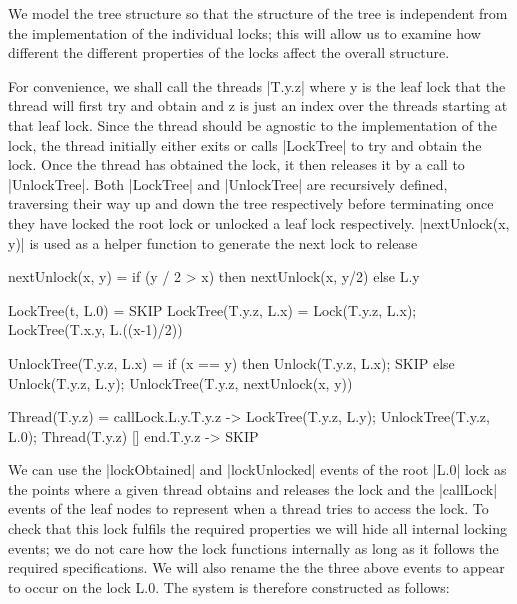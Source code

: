 We model the tree structure so that the structure of the tree is independent from the implementation of the individual locks; this will allow us to examine how different the different properties of the locks affect the overall structure.

For convenience, we shall call the threads |T.{y}.{z}| where y is the leaf lock that the thread will first try and obtain and z is just an index over the threads starting at that leaf lock. Since the thread should be agnostic to the implementation of the lock, the thread initially either exits or calls |LockTree| to try and obtain the lock. Once the thread has obtained the lock, it then releases it by a call to |UnlockTree|. Both |LockTree| and |UnlockTree| are recursively defined, traversing their way up and down the tree respectively before terminating once they have locked the root lock or unlocked a leaf lock respectively. 
|nextUnlock(x, y)| is used as a helper function to generate the next lock to release 

\begin{cspm}
  nextUnlock(x, y) = if (y / 2 > x) then nextUnlock(x, y/2) else L.y 

  LockTree(t, L.0) = SKIP
  LockTree(T.y.z, L.x) = Lock(T.y.z, L.x); LockTree(T.x.y, L.((x-1)/2))

  UnlockTree(T.y.z, L.x) = if (x == y) then Unlock(T.y.z, L.x); SKIP
                           else Unlock(T.y.z, L.y); 
                                UnlockTree(T.y.z, nextUnlock(x, y))

  Thread(T.y.z) = callLock.L.y.T.y.z -> LockTree(T.y.z, L.y); 
                                          UnlockTree(T.y.z, L.0); 
                                          Thread(T.y.z)
                 [] end.T.y.z -> SKIP
\end{cspm}

We can use the |lockObtained| and |lockUnlocked| events of the root |L.0| lock as the points where a given thread obtains and releases the lock and the |callLock| events of the leaf nodes to represent when a thread tries to access the lock. To check that this lock fulfils the required properties we will hide all internal locking events; we do not care how the lock functions internally as long as it follows the required specifications. We will also rename the the three above events to appear to occur on the lock L.0. The system is therefore constructed as follows:

